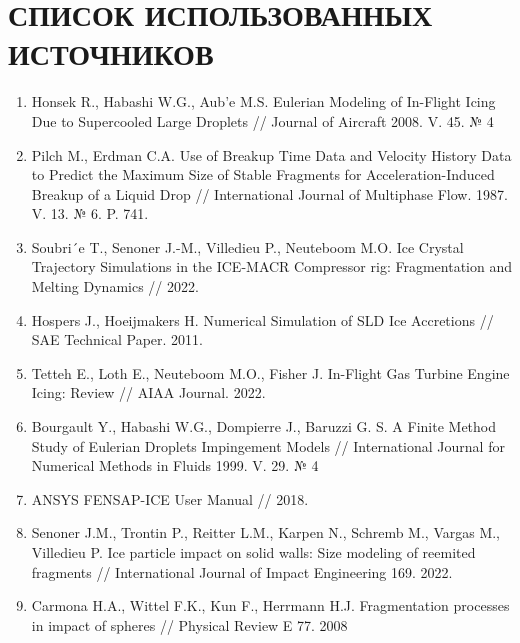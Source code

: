\chapter*{СПИСОК ИСПОЛЬЗОВАННЫХ ИСТОЧНИКОВ}


\begin{enumerate}[label=\arabic*)\hspace{1em}, leftmargin=1cm, itemsep=0em]
	\item Honsek R., Habashi W.G., Aub'e M.S. Eulerian Modeling of In-Flight Icing Due to Supercooled Large Droplets // Journal of Aircraft 2008. V. 45.  № 4
	\item Pilch M., Erdman C.A. Use of Breakup Time Data and Velocity History Data to Predict the Maximum Size of Stable Fragments for Acceleration-Induced Breakup of a Liquid Drop // International Journal of Multiphase Flow. 1987. V. 13. № 6. P. 741.
	\item Soubri´e T., Senoner J.-M., Villedieu P., Neuteboom M.O. Ice Crystal Trajectory Simulations in the ICE-MACR Compressor rig: Fragmentation and Melting Dynamics // 2022.
	\item Hospers J., Hoeijmakers H. Numerical Simulation of SLD Ice Accretions // SAE Technical Paper. 2011.
	\item Tetteh E., Loth E., Neuteboom M.O., Fisher J.  In-Flight Gas Turbine Engine Icing: Review // AIAA Journal. 2022.
	\item Bourgault Y., Habashi W.G., Dompierre J., Baruzzi G. S. A Finite Method Study of Eulerian Droplets Impingement Models // International Journal for Numerical Methods in Fluids 1999. V. 29. № 4
	\item ANSYS FENSAP-ICE User Manual // 2018.
	\item Senoner J.M., Trontin P., Reitter L.M., Karpen N., Schremb M., Vargas M., Villedieu P. Ice particle impact on solid walls: Size modeling of reemited fragments // International Journal of Impact Engineering 169. 2022.
	\item Carmona H.A., Wittel F.K., Kun F., Herrmann H.J. Fragmentation processes in impact of spheres // Physical Review E 77. 2008 
\end{enumerate} 